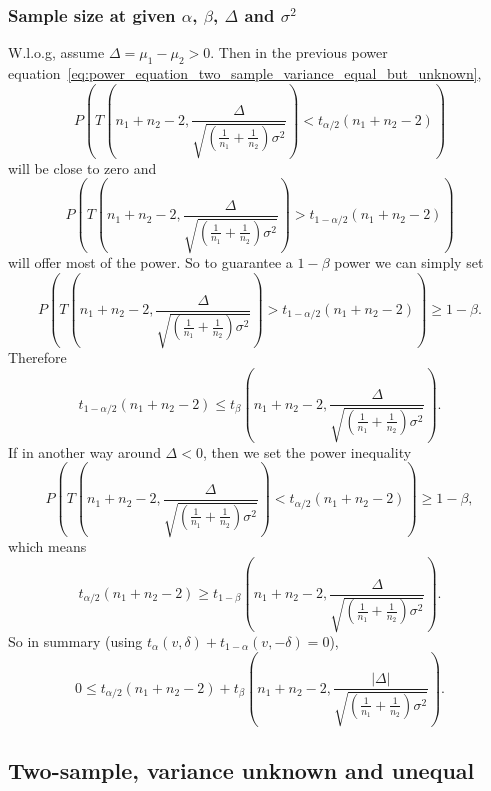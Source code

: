 \documentclass[a4paper,12pt]{article}
\begin{document}
\subsubsection{Sample size at given $\alpha$, $\beta$, $\Delta$ and $\sigma^2$}
\label{sec:sample-size-at-3}

W.l.o.g, assume $\Delta = \mu_1 - \mu_2 > 0$. Then in the previous power equation~\eqref{eq:power_equation_two_sample_variance_equal_but_unknown},
\[
  P\left(
    T{\left(
        n_1 + n_2 - 2,
        \frac{\Delta}{\sqrt{\left(\frac{1}{n_1} + \frac{1}{n_2}\right)\sigma^2}}
      \right)}
    < t_{\alpha / 2}\left(n_1 + n_2 - 2\right)
  \right)
\]
will be close to zero and
\[
  P\left(
    T{\left(
        n_1 + n_2 - 2,
        \frac{\Delta}{\sqrt{\left(\frac{1}{n_1} + \frac{1}{n_2}\right)\sigma^2}}
      \right)}
    > t_{1 - \alpha / 2}\left(n_1 + n_2 - 2\right)
  \right) 
\]
will offer most of the power. So to guarantee a $1 - \beta$ power we can simply set
\[
    P\left(
    T{\left(
        n_1 + n_2 - 2,
        \frac{\Delta}{\sqrt{\left(\frac{1}{n_1} + \frac{1}{n_2}\right)\sigma^2}}
      \right)}
    > t_{1 - \alpha / 2}\left(n_1 + n_2 - 2\right)
  \right)
  \geq 1 - \beta
  .
\]
Therefore
\[
  t_{1 - \alpha / 2}\left(n_1 + n_2 - 2\right)
  \leq
  t_{\beta}\left(
    n_1 + n_2 - 2,
    \frac{\Delta}{\sqrt{\left(\frac{1}{n_1} + \frac{1}{n_2}\right)\sigma^2}}
  \right)
  .
\]
If in another way around $\Delta < 0$, then we set the power inequality
\[
    P\left(
    T{\left(
        n_1 + n_2 - 2,
        \frac{\Delta}{\sqrt{\left(\frac{1}{n_1} + \frac{1}{n_2}\right)\sigma^2}}
      \right)}
    < t_{\alpha / 2}\left(n_1 + n_2 - 2\right)
  \right)
  \geq 1 - \beta
  ,
\]
which means
\[
  t_{\alpha / 2}\left(n_1 + n_2 - 2\right)
  \geq
  t_{1 - \beta}\left(
    n_1 + n_2 - 2,
    \frac{\Delta}{\sqrt{\left(\frac{1}{n_1} + \frac{1}{n_2}\right)\sigma^2}}
  \right)
  .
\]
So in summary (using $t_{\alpha}\left(v, \delta\right) + t_{1 - \alpha}\left(v, -\delta\right) = 0$),
\[
  0
  \leq
  t_{\alpha / 2}\left(n_1 + n_2 - 2\right)
  + t_{\beta}\left(
    n_1 + n_2 - 2,
    \frac{\left|\Delta\right|}{\sqrt{\left(\frac{1}{n_1} + \frac{1}{n_2}\right)\sigma^2}}
  \right)
  .
\]

\subsection{Two-sample, variance unknown and unequal}
\label{sec:two-sample-variance-2}
\end{document}
